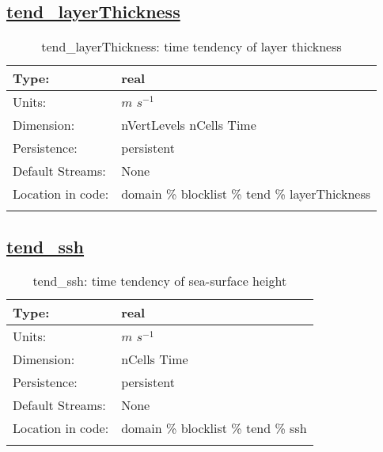 \subsection[tend\_layerThickness]{\hyperref[sec:var_tab_tend]{tend\_layerThickness}}
\label{subsec:var_sec_tend_tend_layerThickness}
\begin{center}
\begin{longtable}{| p{2.0in} | p{4.0in} |}
        \hline 
        Type: & real \\
        \hline 
        Units: & $m$ $s^{-1}$ \\
        \hline 
        Dimension: & nVertLevels nCells Time \\
        \hline 
        Persistence: & persistent \\
        \hline 
		 Default Streams: & None \\
        \hline 
		 Location in code: & domain \% blocklist \% tend \% layerThickness \\
		 \hline 
    \caption{tend\_layerThickness: time tendency of layer thickness}
\end{longtable}
\end{center}
\subsection[tend\_ssh]{\hyperref[sec:var_tab_tend]{tend\_ssh}}
\label{subsec:var_sec_tend_tend_ssh}
\begin{center}
\begin{longtable}{| p{2.0in} | p{4.0in} |}
        \hline 
        Type: & real \\
        \hline 
        Units: & $m$ $s^{-1}$ \\
        \hline 
        Dimension: & nCells Time \\
        \hline 
        Persistence: & persistent \\
        \hline 
		 Default Streams: & None \\
        \hline 
		 Location in code: & domain \% blocklist \% tend \% ssh \\
		 \hline 
    \caption{tend\_ssh: time tendency of sea-surface height}
\end{longtable}
\end{center}
